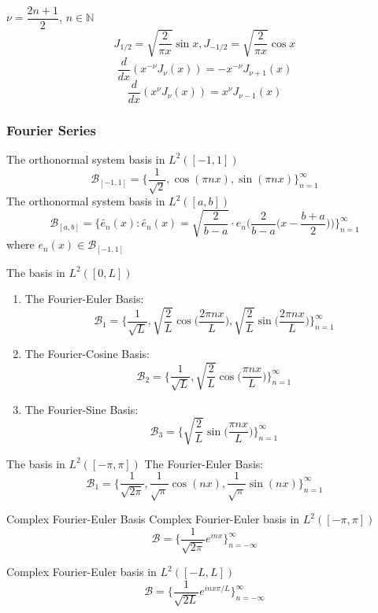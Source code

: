 \documentclass{beamer}
\begin{document}
\begin{frame}
\begin{block}{$\nu=\dfrac{2n+1}{2}$, $n\in\mathbb{N}$}
$$J_{1/2}=\sqrt{\dfrac{2}{\pi x}}\sin x,J_{-1/2}=\sqrt{\dfrac{2}{\pi x}}\cos x$$
$$\dfrac{d}{dx}(x^{-\nu}J_{\nu}(x))= -x^{-\nu}J_{\nu+1}(x)$$
$$\dfrac{d}{dx}(x^{\nu}J_{\nu}(x))= x^{\nu}J_{\nu-1}(x)$$
\end{block}
\end{frame}
\begin{frame}

\frametitle{Fourier Series}

The orthonormal system basis in $L^2([-1,1])$
$$\mathcal{B}_{[-1,1]}=\Big\lbrace \dfrac{1}{\sqrt{2}},\cos(\pi nx),\sin(\pi nx)\Big\rbrace_{n=1}^{\infty}$$
The orthonormal system basis in $L^2([a,b])$
$$\mathcal{B}_{[a,b]}=\Big\lbrace \tilde{e_n}(x):\tilde{e_n}(x)=\sqrt{\dfrac{2}{b-a}}\cdot e_n\Big(\dfrac{2}{b-a}\Big(x-\dfrac{b+a}{2}\Big)\Big)\Big\rbrace_{n=1}^{\infty}$$
where $e_n(x)\in\mathcal{B}_{[-1,1]}$
\end{frame}

\begin{frame}
\begin{block}{The basis in $L^2([0,L])$}
\begin{enumerate}
\item The Fourier-Euler Basis:
$$\mathcal{B}_1=\Big\lbrace \dfrac{1}{\sqrt{L}},\sqrt{\dfrac{2}{L}}\cos\Big(\dfrac{2\pi nx}{L}\Big),\sqrt{\dfrac{2}{L}}\sin\Big(\dfrac{2\pi nx}{L}\Big)\Big\rbrace_{n=1}^{\infty}$$
\item The Fourier-Cosine Basis:
$$\mathcal{B}_2=\Big\lbrace \dfrac{1}{\sqrt{L}},\sqrt{\dfrac{2}{L}}\cos\Big(\dfrac{\pi nx}{L}\Big)\Big\rbrace_{n=1}^{\infty}$$
\item The Fourier-Sine Basis:
$$\mathcal{B}_3=\Big\lbrace \sqrt{\dfrac{2}{L}}\sin\Big(\dfrac{\pi nx}{L}\Big)\Big\rbrace_{n=1}^{\infty}$$
\end{enumerate}
\end{block}
\end{frame}

\begin{frame}

\begin{block}{The basis in $L^2([-\pi,\pi])$}
The Fourier-Euler Basis:
$$\mathcal{B}_1=\Big\lbrace \dfrac{1}{\sqrt{2\pi}},\dfrac{1}{\sqrt{\pi}}\cos(nx),\dfrac{1}{\sqrt{\pi}}\sin(nx)\Big\rbrace_{n=1}^{\infty}$$

\begin{block}{Complex Fourier-Euler Basis}
Complex Fourier-Euler basis in $L^2([-\pi,\pi])$
$$\mathcal{B}=\Big\lbrace \dfrac{1}{\sqrt{2\pi}}e^{inx}\Big\rbrace_{n=-\infty}^{\infty}$$
\end{block}
Complex Fourier-Euler basis in $L^2([-L,L])$
$$\mathcal{B}=\Big\lbrace \dfrac{1}{\sqrt{2L}}e^{inx\pi/L}\Big\rbrace_{n=-\infty}^{\infty}$$
\end{block}
\end{frame}
\end{document}
